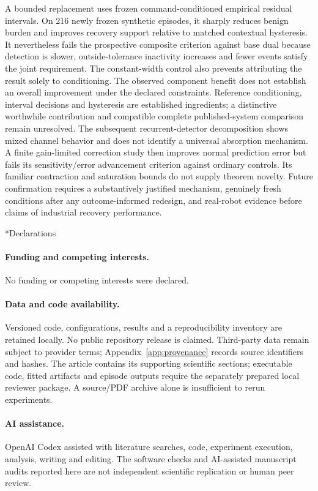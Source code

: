 \documentclass[11pt,twocolumn]{article}
\makeatletter
\renewcommand\section{\@startsection{section}{1}{\z@}{-2.5ex plus -1ex minus -.2ex}{1.2ex plus .2ex}{\normalfont\large\bfseries\raggedright}}
\makeatother
\begin{document}
A bounded replacement uses frozen command-conditioned empirical residual intervals. On 216 newly frozen synthetic episodes, it sharply reduces benign burden and improves recovery support relative to matched contextual hysteresis. It nevertheless fails the prospective composite criterion against base dual because detection is slower, outside-tolerance inactivity increases and fewer events satisfy the joint requirement. The constant-width control also prevents attributing the result solely to conditioning. The observed component benefit does not establish an overall improvement under the declared constraints. Reference conditioning, interval decisions and hysteresis are established ingredients; a distinctive worthwhile contribution and compatible complete published-system comparison remain unresolved. The subsequent recurrent-detector decomposition shows mixed channel behavior and does not identify a universal absorption mechanism. A finite gain-limited correction study then improves normal prediction error but fails its sensitivity/error advancement criterion against ordinary controls. Its familiar contraction and saturation bounds do not supply theorem novelty. Future confirmation requires a substantively justified mechanism, genuinely fresh conditions after any outcome-informed redesign, and real-robot evidence before claims of industrial recovery performance.

\section*{Declarations}
\paragraph{Funding and competing interests.} No funding or competing interests were declared.
\paragraph{Data and code availability.} Versioned code, configurations, results and a reproducibility inventory are retained locally. No public repository release is claimed. Third-party data remain subject to provider terms; Appendix~\ref{app:provenance} records source identifiers and hashes. The article contains its supporting scientific sections; executable code, fitted artifacts and episode outputs require the separately prepared local reviewer package. A source/PDF archive alone is insufficient to rerun experiments.
\paragraph{AI assistance.} OpenAI Codex assisted with literature searches, code, experiment execution, analysis, writing and editing. The software checks and AI-assisted manuscript audits reported here are not independent scientific replication or human peer review.
\appendix



\begingroup\raggedright\fontsize{9.6}{10}\selectfont

\endgroup
\end{document}
